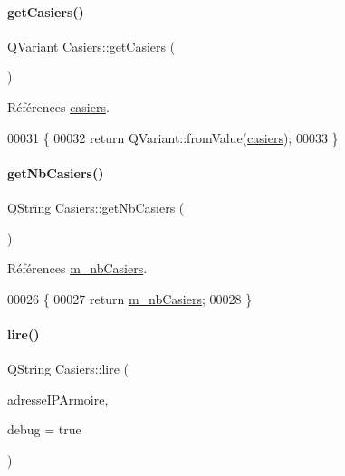 \paragraph{\texorpdfstring{get\+Casiers()}{getCasiers()}}
{\footnotesize\ttfamily Q\+Variant Casiers\+::get\+Casiers (\begin{DoxyParamCaption}{ }\end{DoxyParamCaption})}



Références \hyperlink{class_casiers_ad8fba25144a82ba49b2cd2490dcf975b}{casiers}.


\begin{DoxyCode}
00031 \{
00032     \textcolor{keywordflow}{return} QVariant::fromValue(\hyperlink{class_casiers_ad8fba25144a82ba49b2cd2490dcf975b}{casiers});
00033 \}
\end{DoxyCode}
\mbox{\label{class_casiers_affa8551c477b3cdfe15cd19964d8a391}} 
\paragraph{\texorpdfstring{get\+Nb\+Casiers()}{getNbCasiers()}}
{\footnotesize\ttfamily Q\+String Casiers\+::get\+Nb\+Casiers (\begin{DoxyParamCaption}{ }\end{DoxyParamCaption})}



Références \hyperlink{class_casiers_a7c4b1df1f2e320c22489234fee991f18}{m\+\_\+nb\+Casiers}.


\begin{DoxyCode}
00026 \{
00027     \textcolor{keywordflow}{return} \hyperlink{class_casiers_a7c4b1df1f2e320c22489234fee991f18}{m\_nbCasiers};
00028 \}
\end{DoxyCode}
\mbox{\label{class_casiers_a7b1d58f40217ef13a5dd0d966df38c9a}} 
\paragraph{\texorpdfstring{lire()}{lire()}}
{\footnotesize\ttfamily Q\+String Casiers\+::lire (\begin{DoxyParamCaption}\item[{Q\+String}]{adresse\+I\+P\+Armoire,  }\item[{bool}]{debug = {\ttfamily true} }\end{DoxyParamCaption})}



